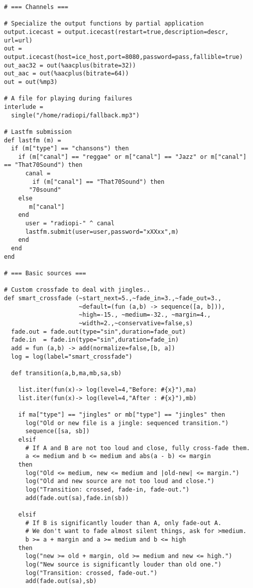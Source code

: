 \begin{verbatim}
# === Channels ===

# Specialize the output functions by partial application
output.icecast = output.icecast(restart=true,description=descr, url=url)
out = output.icecast(host=ice_host,port=8080,password=pass,fallible=true)
out_aac32 = out(%aacplus(bitrate=32))
out_aac = out(%aacplus(bitrate=64))
out = out(%mp3)

# A file for playing during failures
interlude =
  single("/home/radiopi/fallback.mp3")

# Lastfm submission
def lastfm (m) = 
  if (m["type"] == "chansons") then
    if (m["canal"] == "reggae" or m["canal"] == "Jazz" or m["canal"] == "That70Sound") then
      canal = 
        if (m["canal"] == "That70Sound") then 
	   "70sound" 
	else 
	   m["canal"]
	end
      user = "radiopi-" ^ canal
      lastfm.submit(user=user,password="xXXxx",m)
    end
  end
end 

# === Basic sources ===

# Custom crossfade to deal with jingles..
def smart_crossfade (~start_next=5.,~fade_in=3.,~fade_out=3.,
                     ~default=(fun (a,b) -> sequence([a, b])),
                     ~high=-15., ~medium=-32., ~margin=4.,
                     ~width=2.,~conservative=false,s)
  fade.out = fade.out(type="sin",duration=fade_out)
  fade.in  = fade.in(type="sin",duration=fade_in)
  add = fun (a,b) -> add(normalize=false,[b, a])
  log = log(label="smart_crossfade")

  def transition(a,b,ma,mb,sa,sb)

    list.iter(fun(x)-> log(level=4,"Before: #{x}"),ma)
    list.iter(fun(x)-> log(level=4,"After : #{x}"),mb)

    if ma["type"] == "jingles" or mb["type"] == "jingles" then
      log("Old or new file is a jingle: sequenced transition.")
      sequence([sa, sb])
    elsif
      # If A and B are not too loud and close, fully cross-fade them.
      a <= medium and b <= medium and abs(a - b) <= margin
    then
      log("Old <= medium, new <= medium and |old-new| <= margin.")
      log("Old and new source are not too loud and close.")
      log("Transition: crossed, fade-in, fade-out.")
      add(fade.out(sa),fade.in(sb))

    elsif
      # If B is significantly louder than A, only fade-out A.
      # We don't want to fade almost silent things, ask for >medium.
      b >= a + margin and a >= medium and b <= high
    then
      log("new >= old + margin, old >= medium and new <= high.")
      log("New source is significantly louder than old one.")
      log("Transition: crossed, fade-out.")
      add(fade.out(sa),sb)


\end{verbatim}
